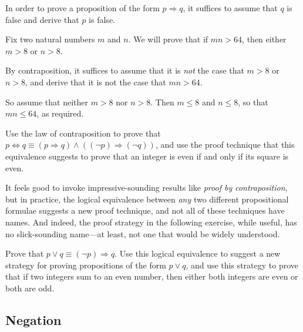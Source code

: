 \begin{strategy}
\label{strProofByContraposition}
In order to prove a proposition of the form $p \Rightarrow q$, it suffices to assume that $q$ is false and derive that $p$ is false.
\end{strategy}

\begin{example}
Fix two natural numbers $m$ and $n$. We will prove that if $mn > 64$, then either $m>8$ or $n>8$.

By contraposition, it suffices to assume that it is \textit{not} the case that $m > 8$ or $n > 8$, and derive that it is not the case that $mn > 64$.

So assume that neither $m>8$ nor $n>8$. Then $m \le 8$ and $n \le 8$, so that $mn \le 64$, as required.
\end{example}

\begin{exercise}
Use the law of contraposition to prove that $p \Leftrightarrow q \equiv (p \Rightarrow q) \wedge ((\neg p) \Rightarrow (\neg q))$, and use the proof technique that this equivalence suggests to prove that an integer is even if and only if its square is even.
\end{exercise}

It feels good to invoke impressive-sounding results like \textit{proof by contraposition}, but in practice, the logical equivalence between \textit{any} two different propositional formulae suggests a new proof technique, and not all of these techniques have names. And indeed, the proof strategy in the following exercise, while useful, has no slick-sounding name---at least, not one that would be widely understood.

\begin{exercise}
Prove that $p \vee q \equiv (\neg p) \Rightarrow q$. Use this logical equivalence to suggest a new strategy for proving propositions of the form $p \vee q$, and use this strategy to prove that if two integers sum to an even number, then either both integers are even or both are odd.
\end{exercise}

\subsection*{Negation}


